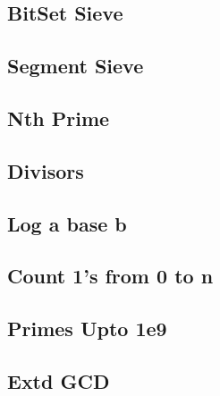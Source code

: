 \documentclass[10pt, a4paper,twocolumn]{article}
\begin{document}
\subsection{BitSet Sieve}


\subsection{Segment Sieve}


\subsection{Nth Prime}


\subsection{Divisors}


% 

\subsection{Log a base b}


\subsection{Count 1's from 0 to n}


\subsection{Primes Upto 1e9}

\subsection{Extd GCD}

\end{document}
